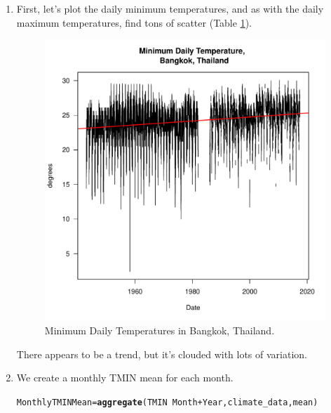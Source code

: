 \documentclass{article}\usepackage[]{graphicx}\usepackage[]{color}
\makeatletter
\def\maxwidth{ %
  \ifdim\Gin@nat@width>\linewidth
    \linewidth
  \else
    \Gin@nat@width
  \fi
}
\newcommand{\hlopt}[1]{\textcolor[rgb]{0,0,0}{#1}}%
\newcommand{\hlstd}[1]{\textcolor[rgb]{0.345,0.345,0.345}{#1}}%
\newcommand{\hlkwb}[1]{\textcolor[rgb]{0.69,0.353,0.396}{#1}}%
\newcommand{\hlkwd}[1]{\textcolor[rgb]{0.737,0.353,0.396}{\textbf{#1}}}%
\newenvironment{kframe}{%
 \def\at@end@of@kframe{}%
 \ifinner\ifhmode%
  \def\at@end@of@kframe{\end{minipage}}%
  \begin{minipage}{\columnwidth}%
 \fi\fi%
 \def\FrameCommand##1{\hskip\@totalleftmargin \hskip-\fboxsep
 \colorbox{shadecolor}{##1}\hskip-\fboxsep
     \hskip-\linewidth \hskip-\@totalleftmargin \hskip\columnwidth}%
 \MakeFramed {\advance\hsize-\width
   \@totalleftmargin\z@ \linewidth\hsize
   \@setminipage}}%
 {\par\unskip\endMakeFramed%
 \at@end@of@kframe}
\newenvironment{knitrout}{}{} %
\makeatother
\begin{document}
\begin{enumerate}

\item First, let's plot the daily minimum temperatures, and as with the daily maximum temperatures, find tons of scatter (Table \ref{fig:TMIN_trend}).

\begin{figure}
\label{fig:TMIN_trend}
\caption{Minimum Daily Temperatures in Bangkok, Thailand.}
\begin{knitrout}
\color{fgcolor}
\includegraphics[width=\maxwidth]{figure/plotDailyTMIN-1} 

\end{knitrout}
\end{figure}

There appears to be a trend, but it's clouded with lots of variation. 

  \item We create a monthly TMIN mean for each month.

\begin{knitrout}
\color{fgcolor}\begin{kframe}
\begin{alltt}
\hlstd{MonthlyTMINMean} \hlkwb{=} \hlkwd{aggregate}\hlstd{(TMIN} \hlopt{~} \hlstd{Month} \hlopt{+} \hlstd{Year, climate_data, mean)}


\end{alltt}
\end{kframe}
\end{knitrout}
\end{enumerate}
\end{document}
